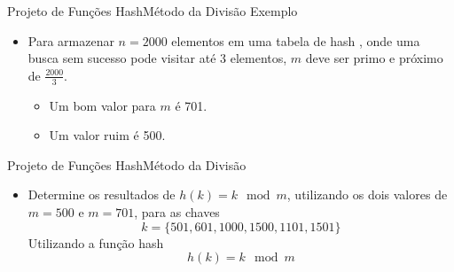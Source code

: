 \documentclass[aspectratio=169]{beamer}
\begin{document}
\begin{frame}{Projeto de Funções Hash}{Método da Divisão}
Exemplo
\begin{itemize}
\item Para armazenar $n = 2000$ elementos em uma tabela de hash , onde uma busca sem sucesso pode visitar até 3 elementos, $m$ deve ser primo e próximo de $\frac{2000}{3}$. 
\pause
\begin{itemize}
\item Um bom valor para $m$ é 701.
\item Um valor ruim é 500.
\end{itemize}
\end{itemize}
\end{frame}

\begin{frame}{Projeto de Funções Hash}{Método da Divisão}
\begin{itemize}
 \item Determine os resultados de $h(k) = k \mod m$, utilizando os dois valores de $m=500$ e $m=701$, para as chaves
\begin{equation}
k = \{501,601,1000,1500,1101,1501\} \nonumber
\end{equation}  
Utilizando a função hash
\begin{equation}
h(k) = k \mod m \nonumber
\end{equation}
\end{itemize}
\end{frame}
\end{document}

